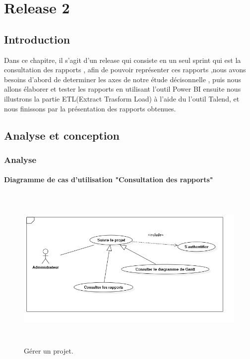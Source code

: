 \chapter{Release 2}


\section{Introduction}

Dans ce chapitre, il s'agit d'un release qui consiste en un seul sprint qui est la consultation des rapports ,
afin de pouvoir repr\'{e}senter ces rapports ,nous avons besoins d'abord de determiner
les axes de notre \'{e}tude d\'{e}cisonnelle , puis nous allons \'{e}laborer et tester les rapports en utilisant l'outil Power BI
ensuite nous illustrons la partie ETL(Extract Trasform Load) \`{a} l'aide du l'outil Talend,
et nous finissons par la pr\'{e}sentation des rapports obtenues.

\section{ Analyse et conception}
\subsection{Analyse}


\subsubsection{ Diagramme de cas d'utilisation "Consultation des rapports"}

\begin{figure}[H]
\center
\includegraphics[width=13cm,height=8cm]{./figures/ucS.png}
\caption{G\'{e}rer un projet.}

\end{figure}

